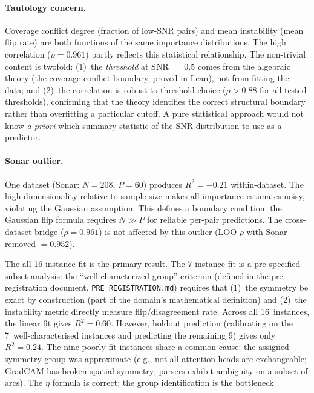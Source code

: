 \documentclass[11pt,a4paper]{article}
\begin{document}
\paragraph{Tautology concern.}  Coverage conflict degree (fraction of low-SNR pairs) and mean instability (mean flip rate) are both functions of the same importance distributions.  The high correlation ($\rho = 0.961$) partly reflects this statistical relationship.  The non-trivial content is twofold: (1)~the \emph{threshold} at SNR~$= 0.5$ comes from the algebraic theory (the coverage conflict boundary, proved in Lean), not from fitting the data; and (2)~the correlation is robust to threshold choice ($\rho > 0.88$ for all tested thresholds), confirming that the theory identifies the correct structural boundary rather than overfitting a particular cutoff.  A pure statistical approach would not know \emph{a priori} which summary statistic of the SNR distribution to use as a predictor.

\paragraph{Sonar outlier.}  One dataset (Sonar: $N = 208$, $P = 60$) produces $R^2 = -0.21$ within-dataset.  The high dimensionality relative to sample size makes all importance estimates noisy, violating the Gaussian assumption.  This defines a boundary condition: the Gaussian flip formula requires $N \gg P$ for reliable per-pair predictions.  The cross-dataset bridge ($\rho = 0.961$) is not affected by this outlier (LOO-$\rho$ with Sonar removed $= 0.952$).

The all-16-instance fit is the primary result.  The 7-instance fit is a
pre-specified subset analysis: the ``well-characterized group'' criterion
(defined in the pre-registration document, \texttt{PRE\_REGISTRATION.md})
requires that (1)~the symmetry be exact by construction (part of the domain's
mathematical definition) and (2)~the instability metric directly measure
flip/disagreement rate.  Across all 16~instances, the linear fit gives $R^2 = 0.60$.  However, holdout prediction (calibrating on the 7~well-characterised instances and predicting the remaining 9) gives only $R^2 = 0.24$.  The nine poorly-fit instances share a
common cause: the assigned symmetry group was approximate (e.g., not all
attention heads are exchangeable; GradCAM has broken spatial symmetry;
parsers exhibit ambiguity on a subset of arcs).  The $\eta$ formula is correct;
the group identification is the bottleneck.
\end{document}
